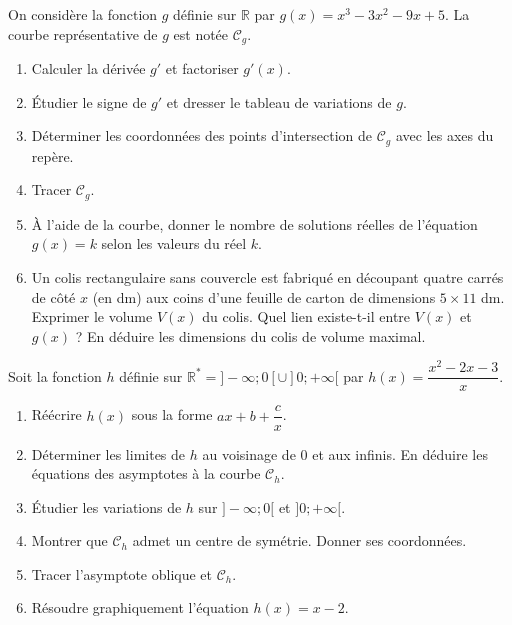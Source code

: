 \documentclass[11pt]{article}
\begin{document}
\begin{exercice}
On considère la fonction $g$ définie sur $\mathbb{R}$ par $g(x) = x^3 - 3x^2 - 9x + 5$. La courbe représentative de $g$ est notée $\mathcal{C}_g$.
\begin{enumerate}
    \item Calculer la dérivée $g'$ et factoriser $g'(x)$.
    \item Étudier le signe de $g'$ et dresser le tableau de variations de $g$.
    \item Déterminer les coordonnées des points d'intersection de $\mathcal{C}_g$ avec les axes du repère.
    \item Tracer $\mathcal{C}_g$.
    \item À l'aide de la courbe, donner le nombre de solutions réelles de l'équation $g(x) = k$ selon les valeurs du réel $k$.
    \item Un colis rectangulaire sans couvercle est fabriqué en découpant quatre carrés de côté $x$ (en dm) aux coins d'une feuille de carton de dimensions $5 \times 11$ dm. Exprimer le volume $V(x)$ du colis. Quel lien existe-t-il entre $V(x)$ et $g(x)$ ? En déduire les dimensions du colis de volume maximal.
\end{enumerate}
\end{exercice}

\begin{exercice}
Soit la fonction $h$ définie sur $\mathbb{R}^* = ]-\infty; 0[ \cup ]0; +\infty[$ par $h(x) = \dfrac{x^2 - 2x - 3}{x}$.
\begin{enumerate}
    \item Réécrire $h(x)$ sous la forme $ax + b + \dfrac{c}{x}$.
    \item Déterminer les limites de $h$ au voisinage de $0$ et aux infinis. En déduire les équations des asymptotes à la courbe $\mathcal{C}_h$.
    \item Étudier les variations de $h$ sur $]-\infty; 0[$ et $]0; +\infty[$.
    \item Montrer que $\mathcal{C}_h$ admet un centre de symétrie. Donner ses coordonnées.
    \item Tracer l'asymptote oblique et $\mathcal{C}_h$.
    \item Résoudre graphiquement l'équation $h(x) = x - 2$.
\end{enumerate}
\end{exercice}
\end{document}
